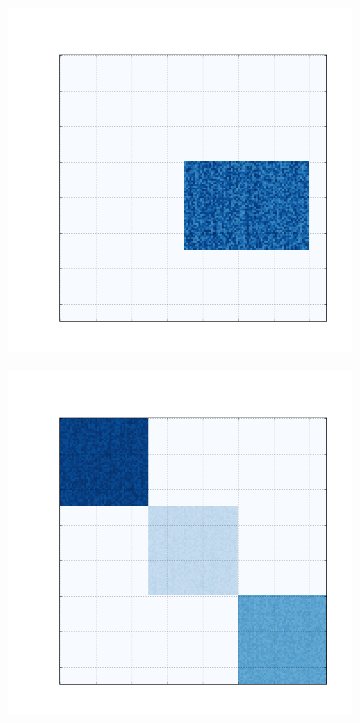 \documentclass[
    12pt,                %
    oneside,            %
    a4paper,            %
    english,            %
    brazil                %
    ]{abntex2ppgsi}
\begin{document}
\begin{figure}[H]
    \begin{subfigure}[b]{0.18\textwidth}
        \includegraphics[width=\textwidth]{img/a-reconstruction-kmeans.png}
        \caption{}
    \end{subfigure}
    \begin{subfigure}[b]{0.18\textwidth}
        \includegraphics[width=\textwidth]{img/b-reconstruction-kmeans.png}

\end{subfigure}
\end{figure}
\end{document}
